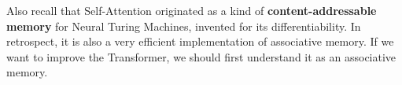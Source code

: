 \documentclass[runningheads]{llncs}
\begin{document}
Also recall that Self-Attention originated as a kind of \textbf{content-addressable memory} for Neural Turing Machines, invented for its differentiability.  In retrospect, it is also a very efficient implementation of associative memory.  If we want to improve the Transformer, we should first understand it as an associative memory.



\end{document}
